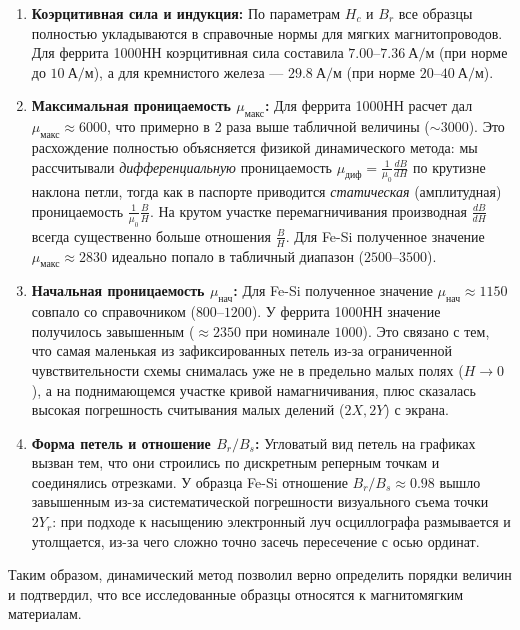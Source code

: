 \documentclass[12pt, letterpaper]{article}
\begin{document}
\begin{enumerate}
    \item \textbf{Коэрцитивная сила и индукция:} По параметрам $H_c$ и $B_r$ все образцы полностью укладываются в справочные нормы для мягких магнитопроводов. Для феррита 1000НН коэрцитивная сила составила $7.00\text{--}7.36~\text{А/м}$ (при норме до $10~\text{А/м}$), а для кремнистого железа — $29.8~\text{А/м}$ (при норме $20\text{--}40~\text{А/м}$).

    \item \textbf{Максимальная проницаемость $\mu_{\text{макс}}$:} Для феррита 1000НН расчет дал $\mu_{\text{макс}} \approx 6000$, что примерно в 2 раза выше табличной величины ($\sim 3000$). Это расхождение полностью объясняется физикой динамического метода: мы рассчитывали \textit{дифференциальную} проницаемость $\mu_{\text{диф}} = \frac{1}{\mu_0}\frac{dB}{dH}$ по крутизне наклона петли, тогда как в паспорте приводится \textit{статическая} (амплитудная) проницаемость $\frac{1}{\mu_0}\frac{B}{H}$. На крутом участке перемагничивания производная $\frac{dB}{dH}$ всегда существенно больше отношения $\frac{B}{H}$. Для Fe-Si полученное значение $\mu_{\text{макс}} \approx 2830$ идеально попало в табличный диапазон ($2500\text{--}3500$).

    \item \textbf{Начальная проницаемость $\mu_{\text{нач}}$:} Для Fe-Si полученное значение $\mu_{\text{нач}} \approx 1150$ совпало со справочником ($800\text{--}1200$). У феррита 1000НН значение получилось завышенным ($\approx 2350$ при номинале $1000$). Это связано с тем, что самая маленькая из зафиксированных петель из-за ограниченной чувствительности схемы снималась уже не в предельно малых полях ($H \to 0$), а на поднимающемся участке кривой намагничивания, плюс сказалась высокая погрешность считывания малых делений ($2X, 2Y$) с экрана.

    \item \textbf{Форма петель и отношение $B_r/B_s$:} Угловатый вид петель на графиках вызван тем, что они строились по дискретным реперным точкам и соединялись отрезками. У образца Fe-Si отношение $B_r/B_s \approx 0.98$ вышло завышенным из-за систематической погрешности визуального съема точки $2Y_r$: при подходе к насыщению электронный луч осциллографа размывается и утолщается, из-за чего сложно точно засечь пересечение с осью ординат.
\end{enumerate}

Таким образом, динамический метод позволил верно определить порядки величин и подтвердил, что все исследованные образцы относятся к магнитомягким материалам.
\end{document}
